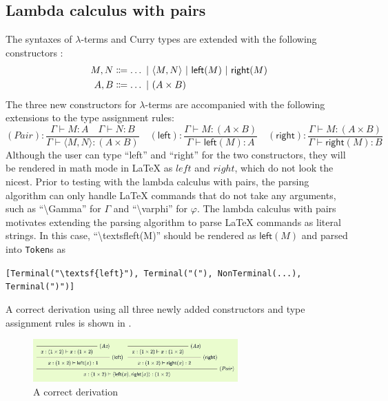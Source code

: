 \subsection{Lambda calculus with pairs}
\label{evaluation:lambda-pairs}
The syntaxes of $\lambda$-terms and Curry types are extended with the following constructors \cite{van-bakel:2022}:
\begin{align*}
    M, N &\Coloneqq \ldots \ |\  \langle M, N \rangle \ |\  \textsf{left}(M) \ |\  \textsf{right}(M) \\
    A, B &\Coloneqq \ldots \ |\  (A \times B)
\end{align*}
The three new constructors for $\lambda$-terms are accompanied with the following extensions to the type assignment rules:
\[
    (\textit{Pair}): \frac{\Gamma \vdash M: A \quad \Gamma \vdash N: B}{\Gamma \vdash \langle M, N \rangle: (A \times B)} \quad (\textsf{left}): \frac{\Gamma \vdash M: (A \times B)}{\Gamma \vdash \textsf{left}(M): A} \quad (\textsf{right}): \frac{\Gamma \vdash M: (A \times B)}{\Gamma \vdash \textsf{right}(M): B} 
\]
Although the user can type ``left'' and ``right'' for the two constructors, they will be rendered in math mode in \LaTeX{} as $left$ and $right$, which do not look the nicest. Prior to testing with the lambda calculus with pairs, the parsing algorithm can only handle \LaTeX{} commands that do not take any arguments, such as ``\textbackslash Gamma'' for $\Gamma$ and ``\textbackslash varphi'' for $\varphi$. The lambda calculus with pairs motivates extending the parsing algorithm to parse \LaTeX{} commands as literal strings. In this case, ``\textbackslash textsf{left}(M)'' should be rendered as $\textsf{left}(M)$ and parsed into \lstinline{Token}s as
\begin{center}
    \lstinline|[Terminal("\textsf{left}"), Terminal("("), NonTerminal(...), Terminal(")")]|
\end{center}
A correct derivation using all three newly added constructors and type assignment rules is shown in .
\begin{figure}[!htbp]
    \centering
    \includegraphics[width=0.7\textwidth]{evaluation/lambda-with-pairs.png}
    \caption{A correct derivation }
    \label{fig:lambda-with-pairs}
\end{figure}

